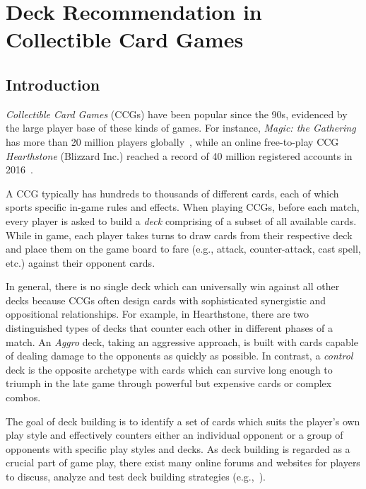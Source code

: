 \chapter{Deck Recommendation in Collectible Card Games} 

\label{chapter:qdeckrec} 


\section{Introduction}\label{sec:introduction}
\textit{Collectible Card Games} (CCGs) have been popular since the 90s, evidenced by the large player base of these kinds of games. For instance, \textit{Magic: the Gathering} has more than 20 million players globally~\cite{guinnessmagic}, while an online free-to-play CCG \textit{Hearthstone} (Blizzard Inc.) reached a record of 40 million registered accounts in 2016~\cite{hearthstonepopular}.  

A CCG typically has hundreds to thousands of different cards, each of which sports specific in-game rules and effects. When playing CCGs, before each match, every player is asked to build a \textit{deck} comprising of a subset of all available cards. While in game, each player takes turns to draw cards from their respective deck and place them on the game board to fare (e.g., attack, counter-attack, cast spell, etc.) against their opponent cards.

In general, there is no single deck which can universally win against all other decks because CCGs often design cards with sophisticated synergistic and oppositional relationships. For example, in Hearthstone, there are two distinguished types of decks that counter each other in different phases of a match. An \textit{Aggro} deck, taking an aggressive approach, is built with cards capable of dealing damage to the opponents as quickly as possible. In contrast, a \textit{control} deck is the opposite archetype with cards which can survive long enough to triumph in the late game through powerful but expensive cards or complex combos.

The goal of deck building is to identify a set of cards which suits the player's own play style and effectively counters either an individual opponent or a group of opponents with specific play styles and decks. As deck building is regarded as a crucial part of game play, there exist many online forums and websites for players to discuss, analyze and test deck building strategies (e.g.,~\cite{hearthpwn,icyveins}).  

